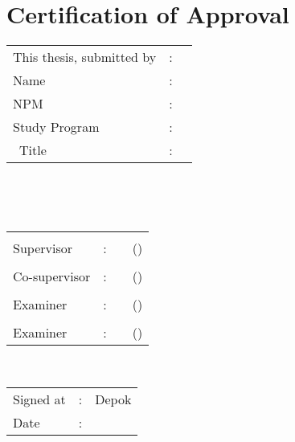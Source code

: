 %
%
%

\chapter*{Certification of Approval}

\vspace*{0.4cm}
\noindent 

\noindent
\begin{tabular}{ll p{9cm}}
	This thesis, submitted by&: & \\
	Name&: & \penulis \\
	NPM&: & \npm \\
	Study Program&: & \program \\
	\type~Title&: & \judul \\
\end{tabular} \\

\vspace*{1.0cm}

\noindent {}\\[0.2cm]

\begin{center}
\end{center}

\vspace*{0.3cm}

\begin{tabular}{l l l l }
	& & & \\
	Supervisor&: & \pembimbing & (\hspace*{3.0cm}) \\
	& & & \\
	Co-supervisor&: & \pembimbingDua & (\hspace*{3.0cm}) \\
	& & & \\
	Examiner&: & & (\hspace*{3.0cm}) \\
	& & & \\
	Examiner&: & & (\hspace*{3.0cm}) \\
\end{tabular}\\

\vspace*{2.0cm}

\begin{tabular}{ll l}
	Signed at&: & Depok\\
	Date&: & \tanggalLulus \\
\end{tabular}


\newpage